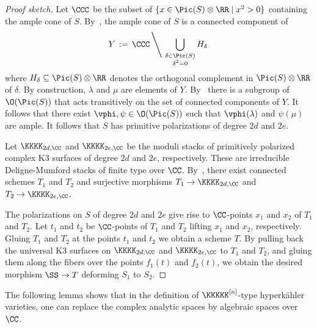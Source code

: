 \begin{proof}[Proof sketch]
    Let $\CCC$ be the subset of $\{x \in \Pic(S) \otimes \RR \mid x^2 > 0\}$ containing the ample cone of $S$. By~\cite[Corollary 8.1.6]{HuybrechtsK3}, the ample cone of $S$ is a connected component of
$$
Y \, := \, \CCC \left\backslash \ \bigcup_{\substack{\delta \in \Pic(S) \\ \delta^2 = 0}} H_{\delta} \right.
$$
where $H_{\delta} \subseteq \Pic(S) \otimes \RR$ denotes the orthogonal complement in $\Pic(S) \otimes \RR$ of $\delta$. By construction, $\lambda$ and $\mu$ are elements of $Y$. By~\cite[Proposition~8.2.6]{HuybrechtsK3} there is a subgroup of $\O(\Pic(S))$ that acts transitively on the set of connected components of $Y$. It follows that there exist $\vphi,\psi \in \O(\Pic(S))$ such that $\vphi(\lambda)$ and $\psi(\mu)$ are ample. It follows that $S$ has primitive polarizations of degree $2d$ and $2e$.

Let $\KKKK_{2d,\CC}$ and $\KKKK_{2e,\CC}$ be the moduli stacks of primitively polarized complex K3 surfaces of degree $2d$ and $2e$, respectively. These are irreducible Deligne-Mumford stacks of finite type over $\CC$. By~\cite[Proposition~4.14]{DeligneMumford}, there exist connected schemes $T_1$ and $T_2$ and surjective morphisms $T_1 \rightarrow \KKKK_{2d,\CC}$ and $T_2 \rightarrow \KKKK_{2e,\CC}$.

    The polarizations on $S$ of degree $2d$ and $2e$ give rise to $\CC$-points $x_1$ and $x_2$ of $T_1$ and $T_2$. Let $t_1$ and $t_2$ be $\CC$-points of $T_1$ and $T_2$ lifting $x_1$ and $x_2$, respectively. Gluing $T_1$ and $T_2$ at the points $t_1$ and $t_2$ we obtain a scheme $T$. By pulling back the universal K3 surfaces on $\KKKK_{2d,\CC}$ and $\KKKK_{2e,\CC}$ to $T_1$ and $T_2$, and gluing them along the fibers over the points $f_1(t)$ and $f_2(t)$, we obtain the desired morphism $\SS \rightarrow T$ deforming $S_1$ to $S_2$.
\end{proof}

The following lemma shows that in the definition of $\KKKKK^{[n]}$-type hyperk\"ahler varieties, one can replace the complex analytic spaces by algebraic spaces over $\CC$.

